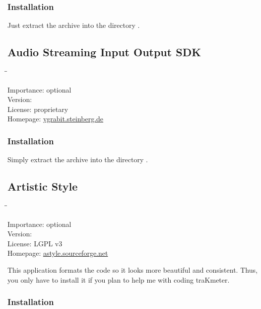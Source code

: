 \subsubsection{Installation}

Just extract the archive into the directory
.

\subsection{Audio Streaming Input Output SDK}

\begin{tabbing}
  \hspace*{6em}\=\=\kill

  Importance:  \> optional \\
  Version:      \\
  License:     \> proprietary \\
  Homepage:    \> \href{http://ygrabit.steinberg.de/}{ygrabit.steinberg.de}
\end{tabbing}

\subsubsection{Installation}

Simply extract the archive into the directory
.

\subsection{Artistic Style}

\begin{tabbing}
  \hspace*{6em}\=\=\kill

  Importance:  \> optional \\
  Version:      \\
  License:     \> LGPL v3 \\
  Homepage:    \> \href{http://astyle.sourceforge.net/}{astyle.sourceforge.net}
\end{tabbing}

This application formats the code so it looks more beautiful and
consistent.  Thus, you only have to install it if you plan to help me
with coding traKmeter.

\subsubsection{Installation}

